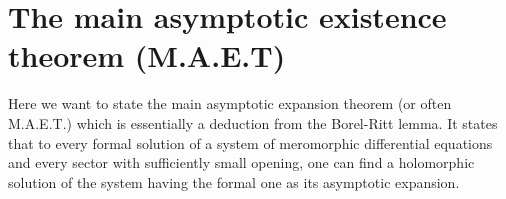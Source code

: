 \section{The main asymptotic existence theorem (M.A.E.T)}\label{sec:MAET}
\begin{comment}
  \begin{multicols}{2}
    \textbf{Classical:}
    \begin{itemize}
      \item \cite[Thm.4.4.1]{Loday2014}
      \item \cite[Thm.7.10]{van2003galois}{\tiny\cite[Thm.7.12]{van2003galois}}
      \item \cite[Thm.IV.12.1]{wasow2002asymptotic}
      \item \cite[5.3.Thm.1]{Varadarajan96linearmeromorphic}
      \item \cite[207]{Balser2000Formal}: Some historical remarks
      \item \cite[Thm.A]{BJL1979Birkhoff}
    \end{itemize}
  \columnbreak
    \textbf{Sheafical:}
    \begin{itemize}
      \item \cite[Thm.2.3.1]{sabbah_cimpa90}
      \item \cite[Sec.4.4]{Loday2014}
    \end{itemize}
  \end{multicols}
\end{comment}
Here we want to state the main asymptotic expansion theorem (or often M.A.E.T.)
which is essentially a deduction from the Borel-Ritt lemma.
It states that to every formal solution of a system of meromorphic differential
equations and every sector with sufficiently small opening, one can find a
holomorphic solution of the system having the formal one as its asymptotic
expansion.

